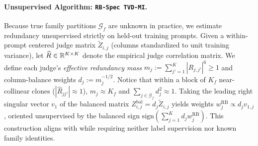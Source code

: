 \paragraph{Unsupervised Algorithm: \texttt{RB-Spec TVD-MI}.}
Because true family partitions $\mathcal{G}_f$ are unknown in practice, we
estimate redundancy unsupervised strictly on held-out training prompts. Given a
within-prompt centered judge matrix $\widetilde{Z}_{i,j}$ (columns standardized to
unit training variance), let $\widehat{R} \in \mathbb{R}^{K \times K}$ denote the empirical
judge correlation matrix. We define each judge's \emph{effective redundancy mass}
$m_j := \sum_{j'=1}^K |\widehat{R}_{j,j'}|^6 \ge 1$ and column-balance weights
$d_j := m_j^{-1/2}$. Notice that within a block of $K_f$ near-collinear clones
($|\widehat{R}_{jj'}| \approx 1$), $m_j \approx K_f$ and $\sum_{j \in \mathcal{G}_f} d_j^2 \approx 1$.
Taking the leading right singular vector $v_1$ of the balanced matrix
$Z^{\mathrm{bal}}_{i,j} = d_j \widetilde{Z}_{i,j}$ yields weights
$w^{\mathrm{RB}}_j \propto d_j v_{1,j}$, oriented unsupervised by the balanced
sign $\mathrm{sign}(\sum_{j=1}^K d_j w^{\mathrm{RB}}_j)$. This construction aligns
with \citet{zhao2026care} while requiring neither label supervision nor known
family identities.
